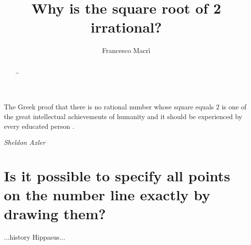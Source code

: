 \documentclass[11pt]{amsart}
\theoremstyle{definition}
\begin{document}
\epigraph{The Greek proof that there is no rational number whose square equals 2 is one of the great intellectual achievements of humanity and it should be experienced by every educated person \cite[4]{axlerAlgebraTrigonometryStudent2012}.} {\textit{Sheldon Axler}}
\title{Why is the square root of 2 irrational?}
\author{Francesco Macrì }
\begin{abstract}
    \dots
\end{abstract}
\maketitle

\section{Is it possible to specify all points on the number line exactly by drawing them?}
...history Hippasus...
\end{document}
